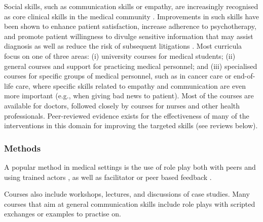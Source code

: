 \documentclass[prodmode,acmtochi]{acmsmall}
\newcommand{\GeraldineFIX}[1]{}
\begin{document}
Social skills, such as communication skills or empathy, are increasingly recognised as core clinical skills in the medical community \cite{Rider2006,Barth2011,Makoul2007,Kalet2004}. Improvements in such skills have been shown to enhance patient satisfaction, increase adherence to psychotherapy, and promote patient willingness to divulge sensitive information that may assist diagnosis as well as reduce the risk of subsequent litigations \cite{Stewart1995,Brown2008}. %
Most curricula focus on one of  three areas: (i) university courses for medical students; (ii) general courses and support for practicing medical personnel; and (iii) specialised courses for specific groups of medical personnel, such as in cancer care or end-of-life care, where specific skills related to empathy and communication are even more important	 (e.g., when giving bad news to patient). Most of the courses are available for doctors, followed closely by courses for nurses and other health professionals. Peer-reviewed evidence exists for the effectiveness of  many of the interventions in this domain for improving the targeted skills
(see reviews below).

\subsubsection*{Methods} A popular method in medical settings is the use of role play both with peers and using trained actors  \cite{Stepien2006,Stiefel2010,Kalet2004,Barth2011}, as well as facilitator or peer based feedback \cite{Rao2007}. 
\GeraldineFIX{G: \textbf{(G: on what?\ on the role plays, or is this another method ie not clear what 'followed by' refers to ... popularity or how role play is used)}}
Courses also include workshops, lectures, and discussions of case studies. Many courses that aim at general communication skills include role plays with scripted exchanges or examples to practise on. 
 \textbf{\GeraldineFIX{G: (G:\ how are these different to role plays??) P: These a specific sub-part of role plays (i.e., you can have other role plays without scripted exchange). I believe it is worth mentioning as such scripted (iu.e., fixed) exchanges can be readily supported by technology.}}
\end{document}
